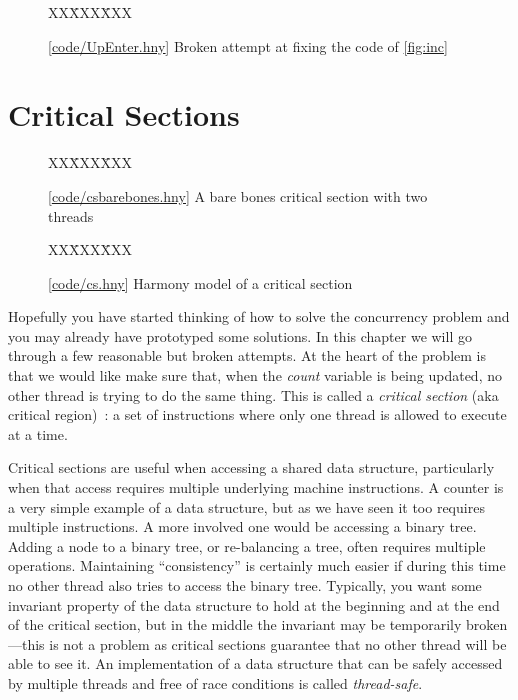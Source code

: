 \documentclass{report}
\newcommand{\harmonysource}[1]{
\begin{tabbing}
XX\=XXX\=XXX\kill
    
\end{tabbing}
}
\newcommand{\harmonylink}[1]{%
[\href{https://harmony.cs.cornell.edu/#1}{\underline{#1}}]%
}
\newenvironment{code}{
\tcolorbox
}{
\endtcolorbox
}
\begin{document}
\begin{figure}
\begin{code}
\harmonysource{UpEnter}
\end{code}
\caption{\harmonylink{code/UpEnter.hny} Broken attempt at fixing the code of \autoref{fig:inc}}
\label{fig:incenter}
\end{figure}

\chapter{Critical Sections}
\label{ch:critical}

\begin{figure}
\begin{code}
\harmonysource{csbarebones}
\end{code}
\caption{\harmonylink{code/csbarebones.hny} A bare bones critical section with two threads}
\label{fig:csbarebones}
\end{figure}

\begin{figure}
\begin{code}
\harmonysource{cs}
\end{code}
\caption{\harmonylink{code/cs.hny} Harmony model of a critical section}
\label{fig:cs}
\end{figure}

Hopefully you have started thinking of how to solve the concurrency
problem and you may already have prototyped some solutions.
In this chapter we will go through a few reasonable but broken attempts.
At the heart of the problem is that we would like make sure that, when
the \textit{count} variable is being updated, no other thread is
trying to do the same thing.  This is called a \emph{critical section}
(aka critical region)~\cite{EWD123}:
a set of instructions where only one thread is allowed to execute at a
time.
%
%

%
%

Critical sections are useful when accessing a shared data
structure, particularly when that access requires multiple underlying
machine instructions.  A counter is a very simple example of
a data structure, but as we have seen it too requires multiple instructions.
A more involved one would be accessing a binary tree.
Adding a node to a binary tree, or re-balancing a tree, often requires
multiple operations.  Maintaining ``consistency'' is certainly much easier
if during this time no other
thread also tries to access the binary tree.
Typically, you want some invariant property of the data structure to hold
at the beginning and at the end of the critical section, but in the middle
the invariant may be temporarily broken---this is not a problem as critical
sections guarantee that no other
thread will be able to see it.
An implementation of a data structure that can be safely accessed by multiple
threads and free of race conditions is called \emph{thread-safe}.
%
%
\end{document}
